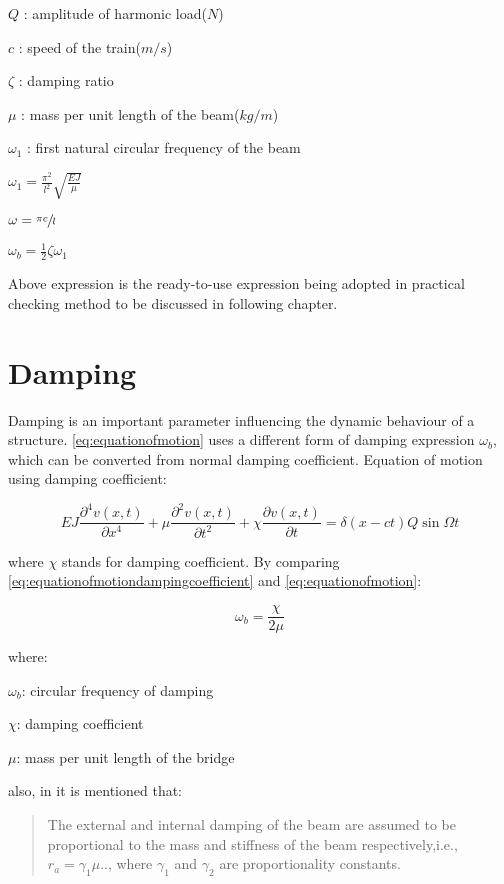 $Q$ : amplitude of harmonic load($N$)

$c$ : speed of the train($m/s$)

$\zeta$ : damping ratio

$\mu$ : mass per unit length of the beam($kg/m$)

$\omega_1$ : first natural circular frequency of the beam

$\omega_1=\frac{\pi^2}{l^2}\sqrt{\frac{EJ}{\mu}}$

$\omega = \sfrac{\pi c}{l}$

$\omega_b = \frac{1}{2}\zeta\omega_1 $


 
Above expression is the ready-to-use expression being adopted in practical checking method to be discussed in following chapter.


\section{Damping}
Damping is an important parameter influencing the dynamic behaviour of a structure. \ref{eq:equationofmotion} uses a different form of damping expression $\omega_b$, which can be converted from normal damping coefficient. Equation of motion using damping coefficient:

\begin{equation}\label{eq:equationofmotiondampingcoefficient}
    EJ\frac{\partial^4 v(x,t)}{\partial x^4} + \mu\frac{\partial^2 v(x,t)}{\partial t^2} +\chi \frac{\partial v(x,t)}{\partial t} = \delta(x-ct)Q\sin\Omega t 
\end{equation}

where $\chi$ stands for damping coefficient. By comparing \ref{eq:equationofmotiondampingcoefficient} and \ref{eq:equationofmotion}:

\begin{equation}
    \omega_b = \frac{\chi}{2\mu}
\end{equation}

where:

$\omega_b$: circular frequency of damping

$\chi$: damping coefficient

$\mu$: mass per unit length of the bridge

also, in \citet[Page.704]{abu2000vibration} it is mentioned that:

\begin{quote}
    The external and internal damping of the beam are assumed to be proportional to the mass and stiffness of the beam respectively,i.e., $r_a = \gamma_1 \mu$.., where $\gamma_1$ and $\gamma_2$ are proportionality constants.
\end{quote}

